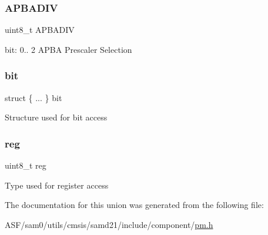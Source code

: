 \subsubsection{\texorpdfstring{APBADIV}{APBADIV}}
{\footnotesize\ttfamily uint8\+\_\+t A\+P\+B\+A\+D\+IV}

bit\+: 0.. 2 A\+P\+BA Prescaler Selection \mbox{\label{union_p_m___a_p_b_a_s_e_l___type_a6466cd6ede190bda55bac053f2238a98}} 
\subsubsection{\texorpdfstring{bit}{bit}}
{\footnotesize\ttfamily struct \{ ... \}   bit}

Structure used for bit access \mbox{\label{union_p_m___a_p_b_a_s_e_l___type_a9428adc9af4653a2050e2536b55dec8d}} 
\subsubsection{\texorpdfstring{reg}{reg}}
{\footnotesize\ttfamily uint8\+\_\+t reg}

Type used for register access 

The documentation for this union was generated from the following file\+:\begin{DoxyCompactItemize}
\item 
A\+S\+F/sam0/utils/cmsis/samd21/include/component/\mbox{\hyperlink{component_2pm_8h}{pm.\+h}}\end{DoxyCompactItemize}

